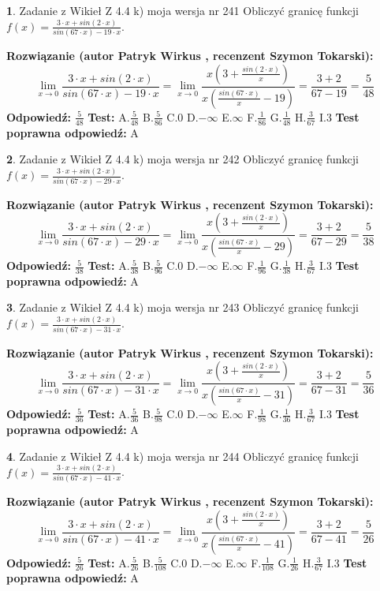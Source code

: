 \documentclass[12pt, a4paper]{article}
\theoremstyle{definition} %
\newtheorem{zad}{}
\newcommand{\zadStart}[1]{\begin{zad}#1\newline}
\newcommand{\zadStop}{\end{zad}}
\newcommand{\rozwStart}[2]{\noindent \textbf{Rozwiązanie (autor #1 , recenzent #2): }\newline}
\newcommand{\rozwStop}{\newline}
\newcommand{\odpStart}{\noindent \textbf{Odpowiedź:}\newline}
\newcommand{\odpStop}{\newline}
\newcommand{\testStart}{\noindent \textbf{Test:}\newline}
\newcommand{\testStop}{\newline}
\newcommand{\kluczStart}{\noindent \textbf{Test poprawna odpowiedź:}\newline}
\newcommand{\kluczStop}{\newline}
\begin{document}
\zadStart{Zadanie z Wikieł Z 4.4 k) moja wersja nr 241}
Obliczyć granicę funkcji $f(x)=\frac{3\cdot x +sin(2\cdot x)}{sin(67\cdot x) -19\cdot x}$.
\zadStop
\rozwStart{Patryk Wirkus}{Szymon Tokarski}
$$\lim\limits_{x\to 0}\frac{3\cdot x +sin(2\cdot x)}{sin(67\cdot x) -19\cdot x}
=\lim\limits_{x\to 0}\frac{x(3+\frac{sin(2\cdot x)}{x})}{x(\frac{sin(67\cdot x)}{x}-19)}
=\frac{3+2}{67-19} = \frac{5}{48}$$
\rozwStop
\odpStart
$\frac{5}{48}$
\odpStop
\testStart
A.$\frac{5}{48}$
B.$\frac{5}{86}$
C.$0$
D.$-\infty$
E.$\infty$
F.$\frac{1}{86}$
G.$\frac{1}{48}$
H.$\frac{3}{67}$
I.$3$
\testStop
\kluczStart
A
\kluczStop



\zadStart{Zadanie z Wikieł Z 4.4 k) moja wersja nr 242}
Obliczyć granicę funkcji $f(x)=\frac{3\cdot x +sin(2\cdot x)}{sin(67\cdot x) -29\cdot x}$.
\zadStop
\rozwStart{Patryk Wirkus}{Szymon Tokarski}
$$\lim\limits_{x\to 0}\frac{3\cdot x +sin(2\cdot x)}{sin(67\cdot x) -29\cdot x}
=\lim\limits_{x\to 0}\frac{x(3+\frac{sin(2\cdot x)}{x})}{x(\frac{sin(67\cdot x)}{x}-29)}
=\frac{3+2}{67-29} = \frac{5}{38}$$
\rozwStop
\odpStart
$\frac{5}{38}$
\odpStop
\testStart
A.$\frac{5}{38}$
B.$\frac{5}{96}$
C.$0$
D.$-\infty$
E.$\infty$
F.$\frac{1}{96}$
G.$\frac{1}{38}$
H.$\frac{3}{67}$
I.$3$
\testStop
\kluczStart
A
\kluczStop



\zadStart{Zadanie z Wikieł Z 4.4 k) moja wersja nr 243}
Obliczyć granicę funkcji $f(x)=\frac{3\cdot x +sin(2\cdot x)}{sin(67\cdot x) -31\cdot x}$.
\zadStop
\rozwStart{Patryk Wirkus}{Szymon Tokarski}
$$\lim\limits_{x\to 0}\frac{3\cdot x +sin(2\cdot x)}{sin(67\cdot x) -31\cdot x}
=\lim\limits_{x\to 0}\frac{x(3+\frac{sin(2\cdot x)}{x})}{x(\frac{sin(67\cdot x)}{x}-31)}
=\frac{3+2}{67-31} = \frac{5}{36}$$
\rozwStop
\odpStart
$\frac{5}{36}$
\odpStop
\testStart
A.$\frac{5}{36}$
B.$\frac{5}{98}$
C.$0$
D.$-\infty$
E.$\infty$
F.$\frac{1}{98}$
G.$\frac{1}{36}$
H.$\frac{3}{67}$
I.$3$
\testStop
\kluczStart
A
\kluczStop



\zadStart{Zadanie z Wikieł Z 4.4 k) moja wersja nr 244}
Obliczyć granicę funkcji $f(x)=\frac{3\cdot x +sin(2\cdot x)}{sin(67\cdot x) -41\cdot x}$.
\zadStop
\rozwStart{Patryk Wirkus}{Szymon Tokarski}
$$\lim\limits_{x\to 0}\frac{3\cdot x +sin(2\cdot x)}{sin(67\cdot x) -41\cdot x}
=\lim\limits_{x\to 0}\frac{x(3+\frac{sin(2\cdot x)}{x})}{x(\frac{sin(67\cdot x)}{x}-41)}
=\frac{3+2}{67-41} = \frac{5}{26}$$
\rozwStop
\odpStart
$\frac{5}{26}$
\odpStop
\testStart
A.$\frac{5}{26}$
B.$\frac{5}{108}$
C.$0$
D.$-\infty$
E.$\infty$
F.$\frac{1}{108}$
G.$\frac{1}{26}$
H.$\frac{3}{67}$
I.$3$
\testStop
\kluczStart
A
\kluczStop
\end{document}
